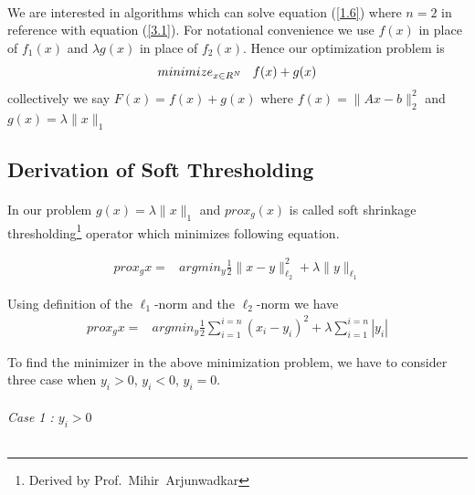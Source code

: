 \paragraph{}We are interested in algorithms which can solve equation (\ref{1.6}) where $n=2$ in reference with
equation (\ref{3.1}). For notational convenience we use $f(x)$ in place of $f_1(x)$ and $\lambda g(x)$ in place of 
$f_2(x)$. Hence our optimization problem is 
\begin{equation}
 minimize_{x \in R^N} \hspace{3mm} f(x) + g(x)
 \label{3.11}
\end{equation}
collectively we say $F(x) = f(x)+g(x)$ where $f(x) =  \parallel Ax-b \parallel_{2}^2$ and $g(x)=\lambda\parallel x \parallel_{1}$

\subsection{Derivation of Soft Thresholding}
\label{s:algorithms_dst}
\paragraph{}In our problem $g(x)=\lambda \parallel x \parallel_{1}$ and $prox_g(x)$ is called soft shrinkage 
thresholding\footnote{Derived by Prof.~Mihir~Arjunwadkar} operator which minimizes following equation.

\begin{equation}
\begin{array}{rl}
prox_gx =& argmin_y \frac{1}{2} \parallel x-y \parallel_{\ell_2}^2 + \lambda \parallel y \parallel_{\ell_1}  
\end{array}
\label{3.12}
\end{equation}

Using definition of the $\ell_1$-norm and the $\ell_2$-norm we have
\begin{equation}
\begin{array}{rl}
prox_gx =& argmin_y \frac{1}{2} \displaystyle\sum\limits_{i=1}^{i=n}(x_i-y_i)^2 + \lambda \displaystyle\sum\limits_{i=1}^{i=n}|y_i|
\end{array}
\label{3.13}
\end{equation}

To find the minimizer in the above minimization problem, we have to consider three case when $y_i>0$, $y_i<0$, $y_i=0$.\\\\

\emph{Case 1 : $y_i > 0$}\\\\

